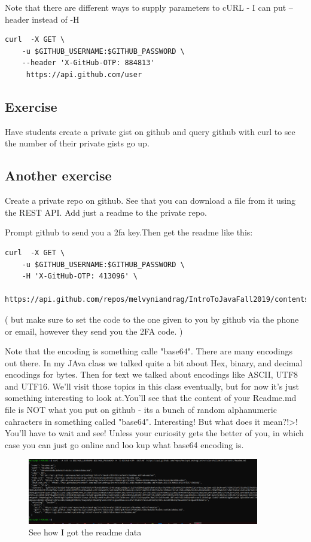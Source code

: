 \documentclass[10pt]{article}
\begin{document}
Note that there are different ways to supply parameters to cURL - I can put --header instead of -H

\begin{lstlisting}
curl  -X GET \
	-u $GITHUB_USERNAME:$GITHUB_PASSWORD \
	--header 'X-GitHub-OTP: 884813'
	 https://api.github.com/user
\end{lstlisting}

\subsection{Exercise}
Have students create a private gist on github and query github with curl to see the number of their private gists go up.

\subsection{Another exercise}
Create a private repo on github. See that you can download a file from it using the REST API. Add just a readme to the private repo.

Prompt github to send you a 2fa key.Then get the readme like this:

\begin{lstlisting}
curl  -X GET \
	-u $GITHUB_USERNAME:$GITHUB_PASSWORD \
	-H 'X-GitHub-OTP: 413096' \
	https://api.github.com/repos/melvyniandrag/IntroToJavaFall2019/contents/Readme.md
\end{lstlisting}

( but make sure to set the code to the one given to you by github via the phone or email, however they send you the 2FA code. )

Note that the encoding is something calle "base64".  There are many encodings out there. In my JAva class we talked quite a bit about Hex, binary, and decimal encodings for bytes. Then for text we talked about encodings like ASCII, UTF8 and UTF16. We'll visit those topics in this class eventually, but for now it's just something interesting to look at.You'll see that the content of your Readme.md file is NOT what you put on github - its a bunch of random alphanumeric cahracters in something called "base64". Interesting! But what does it mean?!>! You'll have to wait and see! Unless your curiosity gets the better of you, in which case you can just go online and loo kup what base64 encoding is.

\begin{figure}[h]
  \centering
    \includegraphics[width=0.9\textwidth]{getReadme.PNG}
  \caption{See how I got the readme data}
\end{figure}
\end{document}
